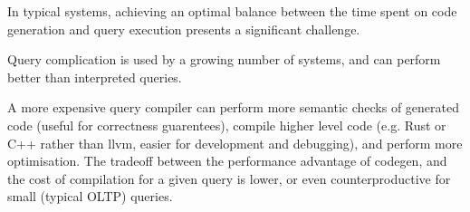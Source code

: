 \documentclass[conference]{IEEEtran}
\begin{document}

In typical systems, achieving an optimal balance between the time spent on code generation and query
execution presents a significant challenge.

Query complication is used by a growing number of systems, and can perform better than interpreted queries.

A more expensive query compiler can perform more semantic checks of generated
code (useful for correctness guarentees), compile higher level code (e.g. Rust or C++ rather than llvm, easier for development and debugging),
and perform more optimisation. The tradeoff between the performance advantage of codegen, and
the cost of compilation for a given query is lower, or even counterproductive for
small (typical OLTP) queries.
\end{document}
